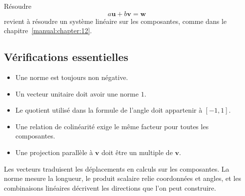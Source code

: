 Résoudre
\[
a\mathbf u+b\mathbf v=\mathbf w
\]
revient à résoudre un système linéaire sur les composantes, comme dans le chapitre~\ref{manual:chapter:12}.

\subsection{Vérifications essentielles}

\begin{itemize}
\item Une norme est toujours non négative.
\item Un vecteur unitaire doit avoir une norme $1$.
\item Le quotient utilisé dans la formule de l'angle doit appartenir à $[-1,1]$.
\item Une relation de colinéarité exige le même facteur pour toutes les composantes.
\item Une projection parallèle à $\mathbf v$ doit être un multiple de $\mathbf v$.
\end{itemize}

\begin{summarybox}
Les vecteurs traduisent les déplacements en calculs sur les composantes. La norme mesure la longueur, le produit scalaire relie coordonnées et angles, et les combinaisons linéaires décrivent les directions que l'on peut construire.
\end{summarybox}


